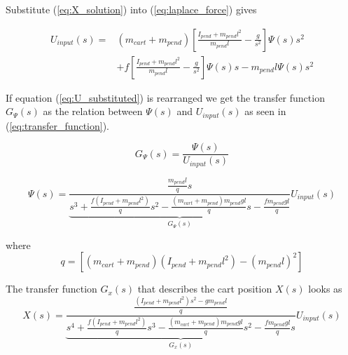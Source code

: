 \begin{appendices}
Substitute (\ref{eq:X_solution}) into (\ref{eq:laplace_force}) gives

\begin{equation}
\begin{split}
	U_{input}(s) = & (m_{cart} + m_{pend}) \left[ \frac{I_{pend} + m_{pend} l^2}{m_{pend} l} - \frac{g}{s^2} \right] \Psi(s) s^2  \\ 
	& + f \left[ \frac{I_{pend} + m_{pend} l^2}{m_{pend} l} - \frac{g}{s^2} \right] \Psi(s) s - m_{pend} l \Psi(s) s^2 
\end{split}
	\label{eq:U_substituted}
\end{equation}

If equation (\ref{eq:U_substituted}) is rearranged we get the transfer function $G_\Psi(s)$ as the relation between $\Psi(s)$ and $U_{input}(s)$ as seen in (\ref{eq:transfer_function}).

\begin{equation}
	G_\Psi(s) = \frac{\Psi(s)}{U_{input}(s)} \label{eq:transfer_function}
\end{equation}

\begin{equation}
	\Psi(s) = \underbrace{\frac{\frac{m_{pend} l}{q} s}{s^3 + \frac{f(I_{pend} + m_{pend} l^2)}{q} s^2 - \frac{(m_{cart} + m_{pend}) m_{pend} g l}{q} s - \frac{f m_{pend} g l}{q}}}_{G_\Psi(s)} U_{input}(s) \label{eq:transfer_function_psi}
\end{equation}

where
\begin{equation}
	q = [(m_{cart} + m_{pend})(I_{pend} + m_{pend} l^2) - (m_{pend} l)^2] \label{eq:q_definition}
\end{equation}

The transfer function $G_x(s)$ that describes the cart position $X(s)$ looks as
\begin{equation}
	X(s) = \underbrace{\frac{\frac{(I_{pend} + m_{pend} l^2) s^2 - g m_{pend} l}{q}}{s^4 + \frac{f(I_{pend} + m_{pend} l^2)}{q} s^3 - \frac{(m_{cart} + m_{pend}) m_{pend} g l}{q} s^2 - \frac{f m_{pend} g l}{q} s}}_{G_x(s)} U_{input}(s) \label{eq:transfer_function_x}
\end{equation}



\end{appendices}
